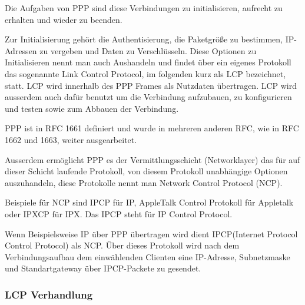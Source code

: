 \documentclass[12pt, a4paper, ngerman]{article}
\begin{document}
Die Aufgaben von PPP sind diese Verbindungen zu initialisieren, aufrecht zu erhalten und wieder zu beenden.

Zur Initialisierung gehört die Authentisierung, die Paketgröße zu bestimmen, IP-Adressen zu vergeben und Daten zu Verschlüsseln.
Diese Optionen zu Initialisieren nennt man auch Aushandeln und findet über ein eigenes Protokoll das sogenannte Link Control Protocol, im folgenden kurz als LCP bezeichnet, statt. LCP wird innerhalb des PPP Frames als Nutzdaten übertragen.
LCP wird ausserdem auch dafür benutzt um die Verbindung aufzubauen, zu konfigurieren und testen sowie zum Abbauen der Verbindung. 

PPP ist in RFC 1661 definiert und wurde in mehreren anderen RFC, wie in RFC 1662 und 1663, weiter ausgearbeitet.

Ausserdem ermöglicht PPP es der Vermittlungsschicht (Networklayer) das für auf dieser Schicht laufende Protokoll, von diesem Protokoll unabhängige Optionen auszuhandeln, diese Protokolle nennt man Network Control Protocol (NCP).

Beispiele für NCP sind IPCP für IP, AppleTalk Control Protokoll für Appletalk oder IPXCP für IPX. Das IPCP steht für IP Control Protocol.

Wenn Beispielsweise IP über PPP übertragen wird dient IPCP(Internet Protocol Control Protocol) als NCP. Über dieses Protokoll wird nach dem Verbindungsaufbau dem einwählenden Clienten eine IP-Adresse, Subnetzmaske und Standartgateway über IPCP-Packete zu gesendet. 


\subsubsection{LCP Verhandlung}
\end{document}
